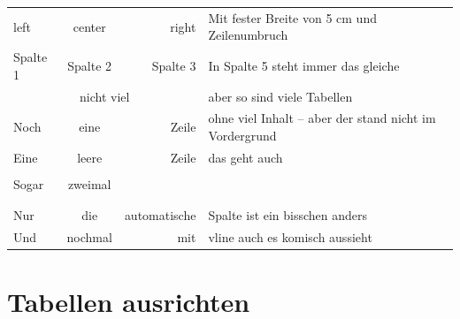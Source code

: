 \begin{tabular}{|l|c|r|p{5cm}|@{ Spalte 5 }|}
    \hline
    left                             & center                      & right        & Mit fester Breite von 5 cm und Zeilenumbruch            \\
    \cline{1-3}
    Spalte 1                         & Spalte 2                    & Spalte 3     & In Spalte 5 \newline steht immer das gleiche            \\
    \hline
    \multicolumn{3}{|c|}{nicht viel} & aber so sind viele Tabellen                                                                          \\
    \cline{4-4}
    Noch                             & eine                        & Zeile        & ohne viel Inhalt -- aber der stand nicht im Vordergrund \\
    \hline
    Eine                             & leere                       & Zeile        & das geht auch                                           \\
                                     &                             &              &                                                         \\
    Sogar                            & zweimal                     &              &                                                         \\
    \hline
                                     &                             &              &                                                         \\
                                     &                             &              &                                                         \\
    Nur                              & die                         & automatische & Spalte ist ein bisschen anders                          \\
    \hline
    Und                              & nochmal                     & mit          & vline \vline auch \vline es komisch \vline aussieht     \\
    \hline
\end{tabular}

\newpage

\section{Tabellen ausrichten}


